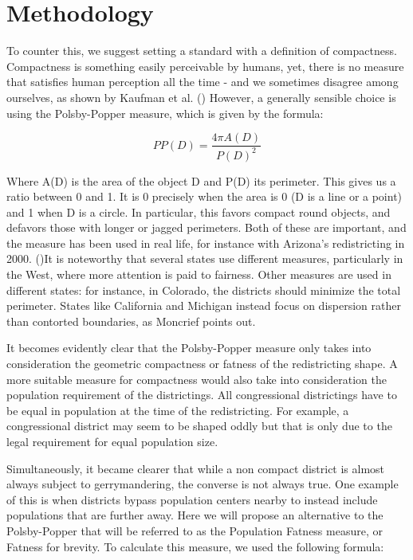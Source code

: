 \documentclass[letterpaper]{article}
\begin{document}
\section{Methodology}
To counter this, we suggest setting a standard with a definition of compactness. Compactness is something easily perceivable by humans, yet, there is no measure that satisfies human perception all the time - and we sometimes disagree among ourselves, as shown by Kaufman et al. (\cite{king})
However, a generally sensible choice is using the Polsby-Popper measure, which is given by the formula:

\[
	PP(D) = \frac{4\pi A(D)}{P(D)^2}
\]


Where A(D) is the area of the object D and P(D) its perimeter. This gives us a ratio between 0 and 1. It is 0 precisely when the area is 0 (D is a line or a point) and 1 when D is a circle. In particular, this favors compact round objects, and defavors those with longer or jagged perimeters. Both of these are important, and the measure has been used in real life, for instance with Arizona’s redistricting in 2000. (\cite{moncrief})It is noteworthy that several states use different measures, particularly in the West, where more attention is paid to fairness.
Other measures are used in different states: for instance, in Colorado, the districts should minimize the total perimeter. States like California and Michigan instead focus on dispersion rather than contorted boundaries, as Moncrief points out. 

It becomes evidently clear that the Polsby-Popper measure only takes into consideration the geometric compactness or fatness of the redistricting shape. A more suitable measure for compactness would also take into consideration the population requirement of the districtings. All congressional districtings have to be equal in population at the time of the redistricting. For example, a congressional district may seem to be shaped oddly but that is only due to the legal requirement for equal population size.

Simultaneously, it became clearer that while a non compact district is almost always subject to gerrymandering, the converse is not always true. One example of this is when districts bypass population centers nearby to instead include populations that are further away.
Here we will propose an alternative to the Polsby-Popper that will be referred to as the Population Fatness measure, or Fatness for brevity. 
To calculate this measure, we used the following formula:
\end{document}
